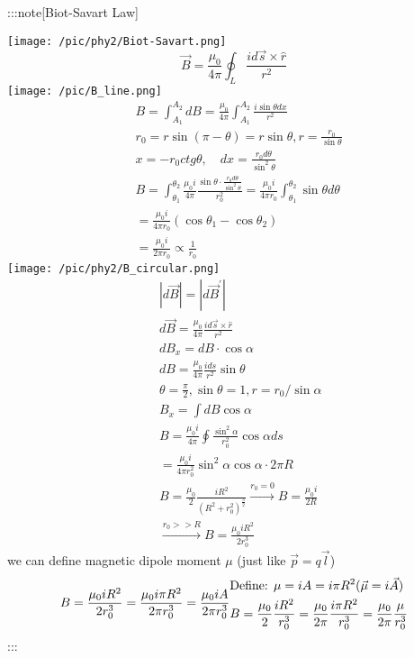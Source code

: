 \documentclass[
]{article}
\begin{document}
:::note{[}Biot-Savart Law{]}

\texttt{[image: /pic/phy2/Biot-Savart.png]} \[
\vec{B}=\frac{\mu_0}{4\pi}\oint_L\frac{id\vec{s}\times\hat{r}}{r^2}
\] \texttt{[image: /pic/B\_line.png]} \[
\begin{aligned}&B=\int_{A_{1}}^{A_{2}}dB=\frac{\mu_{0}}{4\pi}\int_{A_{1}}^{A_{2}}\frac{i\sin\theta dx}{r^{2}}\\&r_{0}=r\sin(\pi-\theta)=r\sin\theta, r=\frac{r_{0}}{\sin\theta}\\&x=-r_{0}ctg\theta,\quad dx=\frac{r_{0}d\theta}{\sin^{2}\theta}\\&B=\int_{\theta_{1}}^{\theta_{2}}\frac{\mu_{0}i}{4\pi}\frac{\sin\theta\cdot\frac{r_{0}d\theta}{\sin^{2}\theta}}{r_{0}^{2}}=\frac{\mu_{0}i}{4\pi r_{0}}\int_{\theta_{1}}^{\theta_{2}}\sin\theta d\theta\\&=\frac{\mu_{0}i}{4\pi r_{0}}(\cos\theta_{1}-\cos\theta_{2})\\&=\frac{\mu _0i}{2\pi r_0}\propto \frac{1}{r_0}\end{aligned}
\] \texttt{[image: /pic/phy2/B\_circular.png]} \[
\begin{aligned}
&\left|d\vec{B}\right|=\left|d\vec{B}^{\prime}\right| \\
&d{\vec{B}}={\frac{\mu_{0}}{4\pi}}{\frac{id{\vec{s}}\times{\hat{r}}}{r^{2}}} \\
&dB_{x}=dB\cdot\cos\alpha \\
&dB=\frac{\mu_{0}}{4\pi}\frac{ids}{r^{2}}\sin\theta \\
&\theta=\frac{\pi}{2}, \sin\theta=1, r=r_{0}/\sin\alpha \\
&B_{x}=\int dB\cos\alpha \\
&B=\frac{\mu_{0}i}{4\pi}\oint\frac{\sin^{2}\alpha}{r_{0}^{2}}\cos\alpha ds\\&=\frac{\mu_{0}i}{4\pi r_{0}^{2}}\sin^{2}\alpha\cos\alpha\cdot2\pi R\\
&B=\frac{\mu_0}{2} \frac{iR^2}{(R^2+r_0^2)^{\frac{3}{2}}}\xrightarrow{r_0=0}B=\frac{\mu_0 i}{2R}\\\ &\xrightarrow {r_0>>R} B=\frac{\mu_0 i R^2}{2r_0^3}
\end{aligned}
\] we can define magnetic dipole moment \(\mu\) (just like
\(\vec p= q\vec l\)) \[
B=\frac{\mu_0iR^2}{2r_0^3}=\frac{\mu_0i\pi R^2}{2\pi r_0^3}=\frac{\mu_0iA}{2\pi r_0^3}\\\begin{aligned}&\text{Define: }\mu=iA=i\pi R^2(\vec \mu =i\vec A)\\&B=\frac{\mu_{0}}{2}\frac{iR^{2}}{r_{0}^{3}}=\frac{\mu_{0}}{2\pi}\frac{i\pi R^{2}}{r_{0}^{3}}=\frac{\mu_{0}}{2\pi}\frac{\mu}{r_{0}^{3}}\end{aligned}
\] :::
\end{document}
